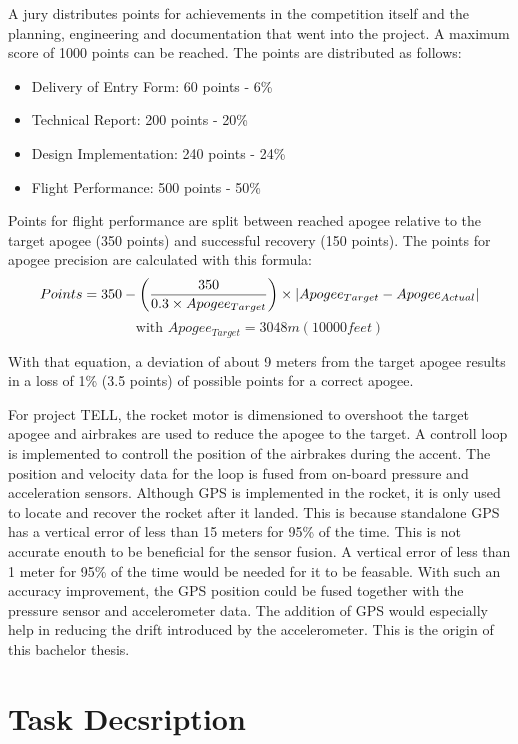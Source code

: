 \vspace{0.5cm}

A jury distributes points for achievements in the competition itself and the planning, engineering and documentation that went into the project.
A maximum score of 1000 points can be reached.
The points are distributed as follows:
\begin{itemize}
 \item Delivery of Entry Form: 60 points - 6\%
 \item Technical Report: 200 points - 20\%
 \item Design Implementation: 240 points - 24\%
 \item Flight Performance: 500 points - 50\%
\end{itemize}

Points for flight performance are split between reached apogee relative to the target apogee (350 points) and successful recovery (150 points).
The points for apogee precision are calculated with this formula:
$$ Points = 350 - \left( \frac{350}{0.3 \times Apogee_{Target}} \right) \times \abs{Apogee_{Target} - Apogee_{Actual}} $$
$$ \text{with } Apogee_{Target} = 3048m(10000feet)$$ 

With that equation, a deviation of about 9 meters from the target apogee results in a loss of 1\% (3.5 points) of possible points for a correct apogee. \cite{sac_rules2017}

For project TELL, the rocket motor is dimensioned to overshoot the target apogee and airbrakes are used to reduce the apogee to the target.
A controll loop is implemented to controll the position of the airbrakes during the accent.
The position and velocity data for the loop is fused from on-board pressure and acceleration sensors.
Although GPS is implemented in the rocket, it is only used to locate and recover the rocket after it landed.
This is because standalone GPS has a vertical error of less than 15 meters for 95\% of the time. \cite{SPS_Performance}
This is not accurate enouth to be beneficial for the sensor fusion.
A vertical error of less than 1 meter for 95\% of the time would be needed for it to be feasable.
With such an accuracy improvement, the GPS position could be fused together with the pressure sensor and accelerometer data.
The addition of GPS would especially help in reducing the drift introduced by the accelerometer.
This is the origin of this bachelor thesis.


\section{Task Decsription}


